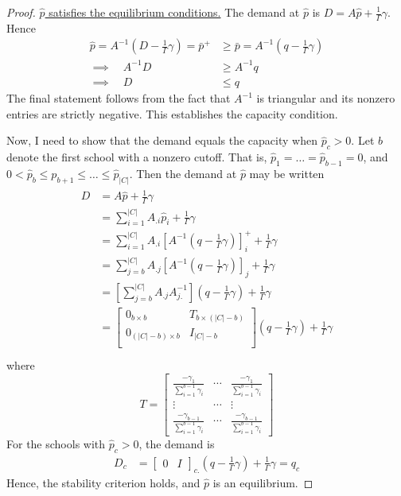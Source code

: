 \documentclass[12pt]{article}
\theoremstyle{definition}
\begin{document}
\begin{proof}
\underline{$\hat p$ satisfies the equilibrium conditions.} The demand at $\hat p$ is $D = A \hat p + \frac{1}{\Gamma}\gamma$. Hence
\begin{align*}
\hat p = A^{-1} (D - \frac{1}{\Gamma} \gamma) = \bar p^+ &\geq \bar p = A^{-1} (q - \frac{1}{\Gamma} \gamma) \\
\implies \quad A^{-1} D &\geq A^{-1} q \\
\implies \quad D &\leq q
\end{align*}
The final statement follows from the fact that $A^{-1}$ is triangular and its nonzero entries are strictly negative. This establishes the capacity condition. 

Now, I need to show that the demand equals the capacity when $\hat p_c > 0$. Let $b$ denote the first school with a nonzero cutoff. That is, $\hat p_1 = \dots = \hat p_{b-1} = 0$, and $0 < \hat p_b \leq p_{b+1} \leq \dots \leq \hat p_{|C|}$. Then the demand at $\hat p$ may be written
\begin{gather}\begin{aligned} \label{demandatphat}
D &= A \hat p + \frac{1}{\Gamma}\gamma \\
&= \sum_{i=1}^{|C|} A_{.i} \hat p_i + \frac{1}{\Gamma}\gamma  \\
&= \sum_{i=1}^{|C|} A_{.i} \left[A^{-1} \left(q - \frac{1}{\Gamma}\gamma\right) \right]_i^+ + \frac{1}{\Gamma}\gamma  \\
&= \sum_{j=b}^{|C|} A_{.j} \left[A^{-1} \left(q - \frac{1}{\Gamma}\gamma\right) \right]_j + \frac{1}{\Gamma}\gamma  \\
&= \left[\sum_{j=b}^{|C|} A_{.j} A_{j.}^{-1} \right] \left(q - \frac{1}{\Gamma}\gamma\right) + \frac{1}{\Gamma}\gamma  \\
&= \begin{bmatrix}
0_{b \times b} & T_{b \times (|C| - b)} \\
0_{(|C| - b) \times b} & I_{|C| - b} \\
\end{bmatrix} \left(q - \frac{1}{\Gamma}\gamma\right) + \frac{1}{\Gamma}\gamma  \\
\end{aligned}\end{gather}
where
\begin{equation} \label{Tdef}
T = \begin{bmatrix}
\frac{-\gamma_1}{\sum_{i=1}^{b-1} \gamma_i} & \cdots & \frac{-\gamma_1}{\sum_{i=1}^{b-1} \gamma_i} \\
\vdots & \cdots & \vdots \\
\frac{-\gamma_{b-1}}{\sum_{i=1}^{b-1} \gamma_i} & \cdots & \frac{-\gamma_{b-1}}{\sum_{i=1}^{b-1} \gamma_i}
\end{bmatrix}\end{equation}
For the schools with $\hat p_c > 0$, the demand is
\begin{align} \label{demand-pc-gt-zero}
D_c &=
\begin{bmatrix}
0& I
\end{bmatrix}_{c.} \left(q - \frac{1}{\Gamma}\gamma\right) + \frac{1}{\Gamma}\gamma
= q_c
\end{align}
Hence, the stability criterion holds, and $\hat p$ is an equilibrium.
\end{proof}
\end{document}
